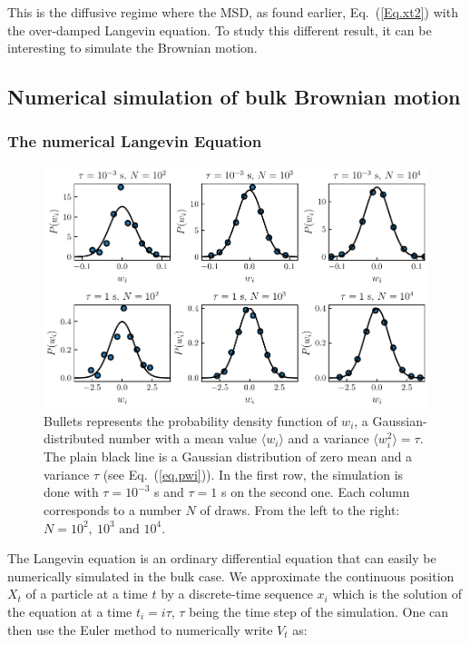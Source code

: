 This is the diffusive regime where the \gls{MSD}, as found earlier, Eq.~(\ref{Eq.xt2}) with the over-damped Langevin equation. To study this different result, it can be interesting to simulate the Brownian motion.

\subsection{Numerical simulation of bulk Brownian motion}

\subsubsection{The numerical Langevin Equation}

\begin{figure}[!hb]
	\centering
	\includegraphics{02_body/chapter1/image/noise_simulation/exemple.pdf}
	\caption{Bullets represents the probability density function of $w_i$, a Gaussian-distributed number with a mean value $\langle w_i \rangle$ and a variance $\langle w_i ^2 \rangle  = \tau$. The plain black line is a Gaussian distribution of zero mean and a variance $\tau$ (see Eq.~(\ref{eq.pwi})). In the first row, the simulation is done with $\tau = 10^{-3}$ s and $\tau = 1$ s on the second one. Each column corresponds to a number $N$ of draws. From the left to the right: $N=10^2, ~10^3 \text{ and } 10^4$.\href{https://github.com/eXpensia/Confined-Brownian-Motion/blob/main/02_body/chapter1/image/noise_simulation/noise_simulation.ipynb}{\faGithub}}
	\label{fig:exempleprecisionwi}
\end{figure}


The Langevin equation is an ordinary differential equation that can easily be numerically simulated in the bulk case. We approximate the continuous position $X_t$ of a particle at a time $t$ by a discrete-time sequence $x_i$ which is the solution of the equation at a time $t_i = i  \tau$, $\tau$ being the time step of the simulation. One can then use the Euler method to numerically write $V_t$ as:

